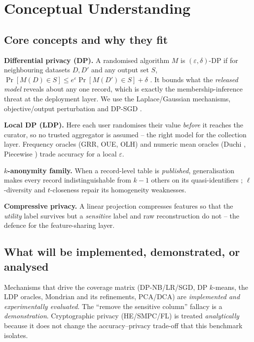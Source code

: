 \documentclass[11pt,a4paper]{article}
\begin{document}
\section{Conceptual Understanding}\label{sec:concept}

\subsection{Core concepts and why they fit}
\textbf{Differential privacy (DP).} A randomised algorithm $M$ is
$(\varepsilon,\delta)$-DP if for neighbouring datasets $D,D'$ and any output set $S$,
$\Pr[M(D)\in S]\le e^{\varepsilon}\Pr[M(D')\in S]+\delta$
\citep{dwork2006calibrating}. It bounds what the \emph{released model} reveals about
any one record, which is exactly the membership-inference threat at the deployment
layer. We use the Laplace/Gaussian mechanisms, objective/output perturbation
\citep{chaudhuri2011differentially} and DP-SGD \citep{abadi2016deep}.

\noindent\textbf{Local DP (LDP).} Here each user randomises their value \emph{before}
it reaches the curator, so no trusted aggregator is assumed -- the right model for
the collection layer. Frequency oracles (GRR, OUE, OLH) \citep{wang2017locally} and
numeric mean oracles (Duchi \citep{duchi2013local}, Piecewise
\citep{wang2019collecting}) trade accuracy for a local $\varepsilon$.

\noindent\textbf{$k$-anonymity family.} When a record-level table is \emph{published},
generalisation makes every record indistinguishable from $k-1$ others on its
quasi-identifiers \citep{sweeney2002kanonymity,lefevre2006mondrian};
$\ell$-diversity \citep{machanavajjhala2007ldiversity} and $t$-closeness
\citep{li2007tcloseness} repair its homogeneity weaknesses.

\noindent\textbf{Compressive privacy.} A linear projection compresses features so that
the \emph{utility} label survives but a \emph{sensitive} label and raw reconstruction
do not \citep{kung2017compressive} -- the defence for the feature-sharing layer.

\subsection{What will be implemented, demonstrated, or analysed}
Mechanisms that drive the coverage matrix (DP-NB/LR/SGD, DP $k$-means, the LDP
oracles, Mondrian and its refinements, PCA/DCA) are \emph{implemented and
experimentally evaluated}. The ``remove the sensitive column'' fallacy is a
\emph{demonstration}. Cryptographic privacy (HE/SMPC/FL) is treated
\emph{analytically} because it does not change the accuracy--privacy trade-off that
this benchmark isolates.
\end{document}

